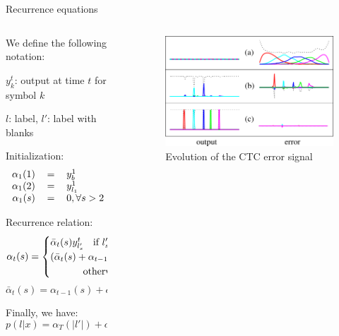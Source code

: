 \documentclass[final]{beamer}
\newlength{\sepwid}
\newlength{\onecolwid}
\newlength{\twocolwid}
\begin{document}
\begin{frame}[t]
\begin{columns}[t]
\begin{column}{\twocolwid}
\begin{block}{Recurrence equations}

\begin{columns}[t,totalwidth=\twocolwid] %
\begin{column}{\onecolwid} %

We define the following notation:

$y_k^t$: output at time $t$ for symbol $k$

$l$: label, $l'$: label with blanks

Initialization:
\[
\begin{tabular}{rcl}
$\alpha_1(1)$ &=& $y_b^1$\\
$\alpha_1(2)$ &=& $y_{l_1}^1$\\
$\alpha_1(s)$ &=& $0, \forall s > 2$
\end{tabular}
\]

Recurrence relation:
\[
\alpha_t(s) = 
\begin{cases}
	\bar{\alpha}_t(s) y_{l'_s}^t \mbox{ \; if } l'_s = b\mbox{ or }l'_{s-2}=l'_s \\
	(\bar{\alpha}_t(s)+\alpha_{t-1}(s-2)) y_{l'_s}^t \\
		\hspace{3em} \mbox{ otherwise}\\
\end{cases}
\]
\[
\bar{\alpha}_t(s) = \alpha_{t-1}(s) + \alpha_{t-1}(s-1)
\]

Finally, we have:
\[
p(l|x) = \alpha_T(|l'|) + \alpha_T(|l'|-1)
\]

\end{column}
\begin{column}{\sepwid}\end{column} %
\begin{column}{\onecolwid} %

\begin{figure}
\includegraphics[width=\linewidth]{azerty2.png}
\caption{Evolution of the CTC error signal}
\end{figure}


\end{column}
\end{columns}
\end{block}
\end{column}
\end{columns}
\end{frame}
\end{document}
